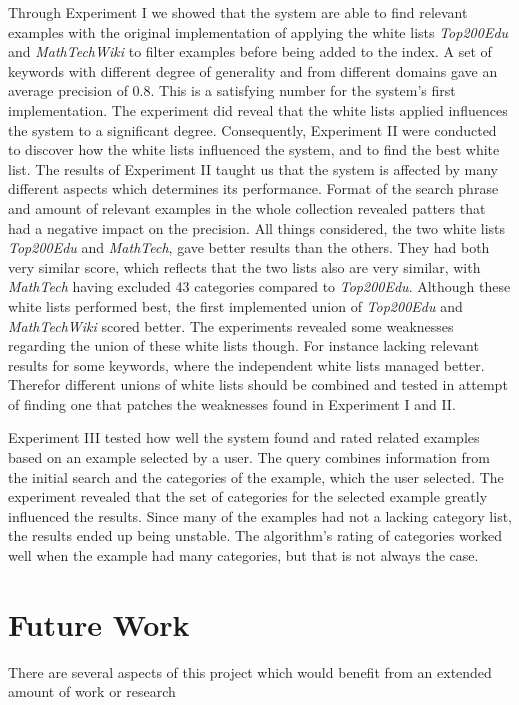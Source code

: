 Through Experiment I we showed that the system are able to find relevant examples with the original implementation of applying the white lists \textit{Top200Edu} and \textit{MathTechWiki} to filter examples before being added to the index. A set of keywords with different degree of generality and from different domains gave an average precision of \(0.8\). This is a satisfying number for the system's first implementation. The experiment did reveal that the white lists applied influences the system to a significant degree. Consequently, Experiment II were conducted to discover how the white lists influenced the system, and to find the best white list. The results of Experiment II taught us that the system is affected by many different aspects which determines its performance. Format of the search phrase and amount of relevant examples in the whole collection revealed patters that had a negative impact on the precision. All things considered, the two white lists \textit{Top200Edu} and \textit{MathTech}, gave better results than the others. They had both very similar score, which reflects that the two lists also are very similar, with \textit{MathTech} having excluded 43 categories compared to \textit{Top200Edu}. Although these white lists performed best, the first implemented union of \textit{Top200Edu} and \textit{MathTechWiki} scored better. The experiments revealed some weaknesses regarding the union of these white lists though. For instance lacking relevant results for some keywords, where the independent white lists managed better. Therefor different unions of white lists should be combined and tested in attempt of finding one that patches the weaknesses found in Experiment I and II.

Experiment III tested how well the system found and rated related examples based on an example selected by a user. The query combines information from the initial search and the categories of the example, which the user selected. The experiment revealed that the set of categories for the selected example greatly influenced the results. Since many of the examples had not a lacking category list, the results ended up being unstable. The algorithm's rating of categories worked well when the example had many categories, but that is not always the case.

\section{Future Work}
There are several aspects of this project which would benefit from an extended amount of work or research

